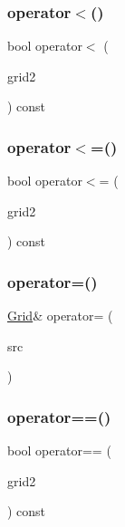 \mbox{\label{classGrid_aefee1b5c152f0cf1b9537b2542f0fccd}} 
\subsubsection{\texorpdfstring{operator$<$()}{operator<()}}
{\footnotesize\ttfamily bool operator$<$ (\begin{DoxyParamCaption}\item[{const \mbox{\hyperlink{classGrid}{Grid}}$<$ Value\+Type $>$ \&}]{grid2 }\end{DoxyParamCaption}) const}

\mbox{\label{classGrid_adc972513ba66ac1e3e5847abe6e8666c}} 
\subsubsection{\texorpdfstring{operator$<$=()}{operator<=()}}
{\footnotesize\ttfamily bool operator$<$= (\begin{DoxyParamCaption}\item[{const \mbox{\hyperlink{classGrid}{Grid}}$<$ Value\+Type $>$ \&}]{grid2 }\end{DoxyParamCaption}) const}

\mbox{\label{classGrid_a4e17188bcb4ffb95efef313dcccc6813}} 
\subsubsection{\texorpdfstring{operator=()}{operator=()}}
{\footnotesize\ttfamily \mbox{\hyperlink{classGrid}{Grid}}\& operator= (\begin{DoxyParamCaption}\item[{const \mbox{\hyperlink{classGrid}{Grid}}$<$ Value\+Type $>$ \&}]{src }\end{DoxyParamCaption})\hspace{0.3cm}{\ttfamily [inline]}}

\mbox{\label{classGrid_ae321d29c4eab96f54c2f86929a345e2b}} 
\subsubsection{\texorpdfstring{operator==()}{operator==()}}
{\footnotesize\ttfamily bool operator== (\begin{DoxyParamCaption}\item[{const \mbox{\hyperlink{classGrid}{Grid}}$<$ Value\+Type $>$ \&}]{grid2 }\end{DoxyParamCaption}) const}

